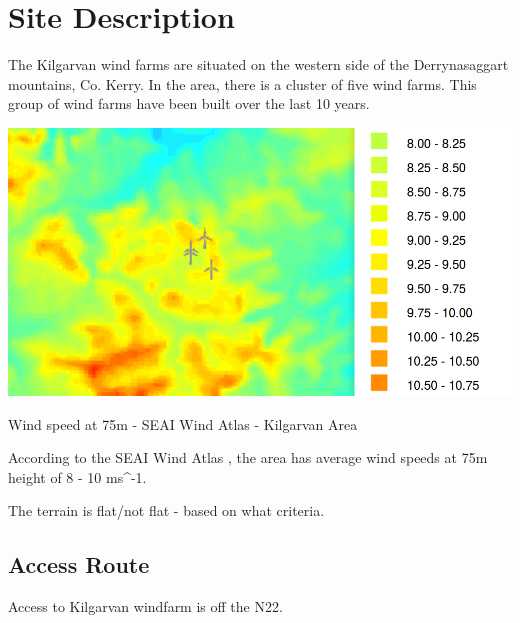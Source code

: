 \documentclass[12pt]{article} %
\begin{document}




\section{Site Description} %

The Kilgarvan wind farms are situated on the western side of the Derrynasaggart mountains, Co. Kerry. In the area, there is a cluster of five wind farms. This group of wind farms have been built over the last 10 years.

  \begin{center}
    \includegraphics[width=1\textwidth]{seai_wind_atlas_kilgarvan}
  \end{center}
  \caption{Wind speed at 75m - SEAI Wind Atlas - Kilgarvan Area}

According to the SEAI Wind Atlas \cite{seai_atlas}, the area has average wind speeds at 75m height of 8 - 10 ms^-1.


The terrain is flat/not flat - based on what criteria.


\subsection{Access Route}
Access to Kilgarvan windfarm is off the N22. 
\end{document}
